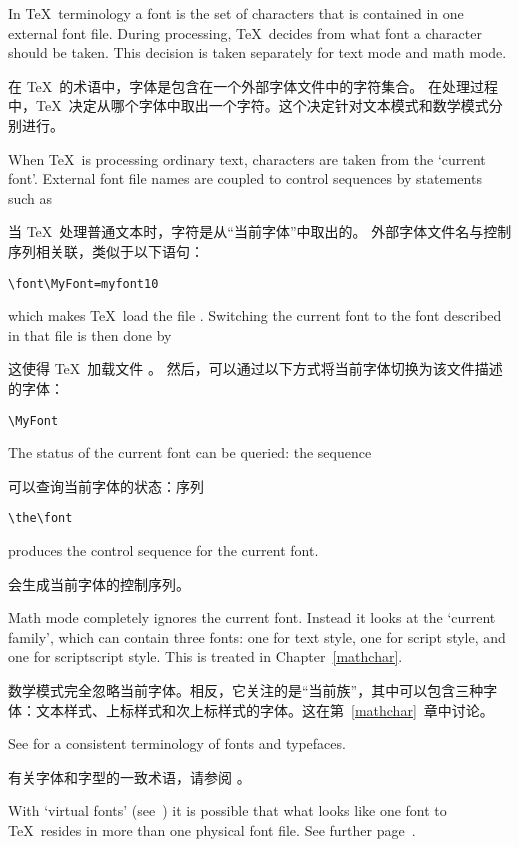 In  \TeX\ terminology a font is the set of characters that
is contained in one external font file. 
During processing, \TeX\ decides from
what font a character should be taken. This decision is
taken separately for text mode and math mode.

在 \TeX\ 的术语中，字体是包含在一个外部字体文件中的字符集合。
在处理过程中，\TeX\ 决定从哪个字体中取出一个字符。这个决定针对文本模式和数学模式分别进行。


When \TeX\ is processing ordinary text, characters are taken
from the `current font'. 
External font file names are coupled to  control sequences
by   statements such as

当 \TeX\ 处理普通文本时，字符是从“当前字体”中取出的。
外部字体文件名与控制序列相关联，类似于以下语句：

\begin{verbatim}
\font\MyFont=myfont10
\end{verbatim}
which makes \TeX\ load the file .
Switching the current font to the font described in that file
is then done by

这使得 \TeX\ 加载文件 。
然后，可以通过以下方式将当前字体切换为该文件描述的字体：

\begin{verbatim}
\MyFont
\end{verbatim}
The status of the current font
can be queried: the sequence 

可以查询当前字体的状态：序列
\begin{verbatim}
\the\font
\end{verbatim}
produces the control sequence for the current font.

会生成当前字体的控制序列。

Math mode completely ignores the current font. Instead
it looks  at the `current family', which can contain
three fonts: one for text style, one for script style,
and one for scriptscript style. This is treated
in Chapter~\ref{mathchar}.
\awp

数学模式完全忽略当前字体。相反，它关注的是“当前族”，其中可以包含三种字体：文本样式、上标样式和次上标样式的字体。这在第~\ref{mathchar}~章中讨论。

See \cite{S} for a consistent terminology of fonts and typefaces.

有关字体和字型的一致术语，请参阅 \cite{S}。

With `virtual fonts' (see~\cite{K:virt}) it is possible that
what looks like one font to \TeX\ resides in more than
one physical font file.
\alt
See further page~\pageref{virtual:fonts}.

